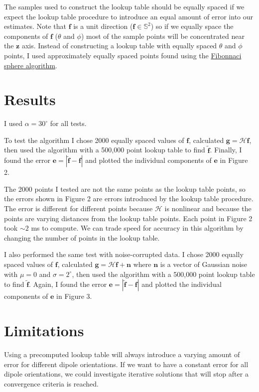 \documentclass[11pt]{article}
\providecommand{\mb}[1]{\mathbf{#1}}
\begin{document}
The samples used to construct the lookup table should be equally spaced if we
expect the lookup table procedure to introduce an equal amount of error into our
estimates. Note that $\mb{f}$ is a unit direction ($\mb{f}\in \mathbb{S}^2$) so
if we equally space the components of $\mb{f}$ ($\theta$ and $\phi$) most of the
sample points will be concentrated near the $\mb{z}$ axis. Instead of
constructing a lookup table with equally spaced $\theta$ and $\phi$ points, I
used approximately equally spaced points found using the
\href{http://stackoverflow.com/a/26127012/5854689}{Fibonnaci sphere algorithm}.

\section{Results}
I used $\alpha = 30^{\circ}$ for all tests.

To test the algorithm I chose 2000 equally spaced values of $\mb{f}$, calculated
$\mb{g} = \mathcal{H}\mb{f}$, then used the algorithm with a 500,000 point
lookup table to find $\tilde{\mb{f}}$. Finally, I found the error
$\mb{e} = |\tilde{\mb{f}} - \mb{f}|$ and plotted the individual components of
$\mb{e}$ in Figure 2.

The 2000 points I tested are not the same points as the lookup table points, so
the errors shown in Figure 2 are errors introduced by the lookup table
procedure. The error is different for different points because $\mathcal{H}$ is
nonlinear and because the points are varying distances from the lookup table
points. Each point in Figure 2 took $\sim 2$ ms to compute. We can trade speed
for accuracy in this algorithm by changing the number of points in the lookup
table.

I also performed the same test with noise-corrupted data. I chose 2000 equally
spaced values of $\mb{f}$, calculated $\mb{g} = \mathcal{H}\mb{f} + \mb{n}$
where $\mb{n}$ is a vector of Gaussian noise with $\mu = 0$ and
$\sigma = 2^\circ$, then used the algorithm with a 500,000 point lookup table to
find $\tilde{\mb{f}}$. Again, I found the error
$\mb{e} = |\tilde{\mb{f}} - \mb{f}|$ and plotted the individual components of
$\mb{e}$ in Figure 3.


\section{Limitations}
Using a precomputed lookup table will always introduce a varying amount of error
for different dipole orientations. If we want to have a constant error for all
dipole orientations, we could investigate iterative solutions that will stop
after a convergence criteria is reached.
\pagebreak
\end{document}
